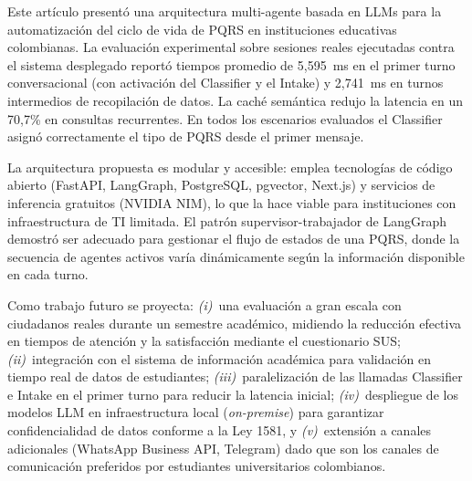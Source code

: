 \documentclass[runningheads]{llncs}
\begin{document}
Este artículo presentó una arquitectura multi-agente basada en LLMs para la automatización del ciclo de vida de PQRS en instituciones educativas colombianas. La evaluación experimental sobre sesiones reales ejecutadas contra el sistema desplegado reportó tiempos promedio de 5{,}595~ms en el primer turno conversacional (con activación del Classifier y el Intake) y 2{,}741~ms en turnos intermedios de recopilación de datos. La caché semántica redujo la latencia en un 70{,}7\% en consultas recurrentes. En todos los escenarios evaluados el Classifier asignó correctamente el tipo de PQRS desde el primer mensaje.

La arquitectura propuesta es modular y accesible: emplea tecnologías de código abierto (FastAPI, LangGraph, PostgreSQL, pgvector, Next.js) y servicios de inferencia gratuitos (NVIDIA NIM), lo que la hace viable para instituciones con infraestructura de TI limitada. El patrón supervisor-trabajador de LangGraph demostró ser adecuado para gestionar el flujo de estados de una PQRS, donde la secuencia de agentes activos varía dinámicamente según la información disponible en cada turno.

Como trabajo futuro se proyecta: \textit{(i)}~una evaluación a gran escala con ciudadanos reales durante un semestre académico, midiendo la reducción efectiva en tiempos de atención y la satisfacción mediante el cuestionario SUS; \textit{(ii)}~integración con el sistema de información académica para validación en tiempo real de datos de estudiantes; \textit{(iii)}~paralelización de las llamadas Classifier e Intake en el primer turno para reducir la latencia inicial; \textit{(iv)}~despliegue de los modelos LLM en infraestructura local (\textit{on-premise}) para garantizar confidencialidad de datos conforme a la Ley 1581, y \textit{(v)}~extensión a canales adicionales (WhatsApp Business API, Telegram) dado que son los canales de comunicación preferidos por estudiantes universitarios colombianos.

\end{document}
